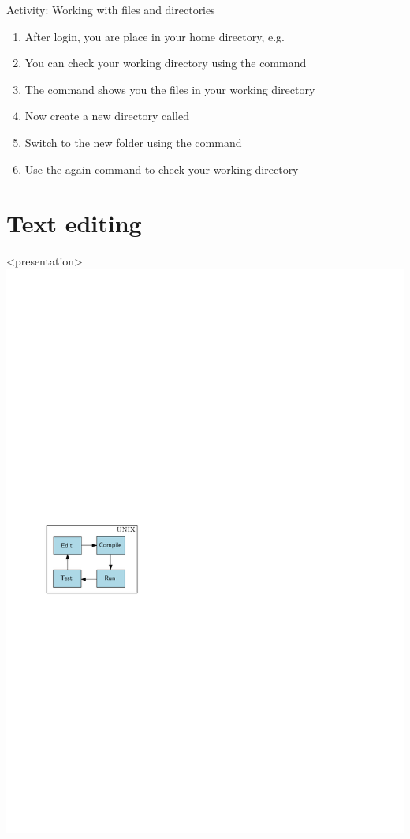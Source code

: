 \begin{frame}[fragile]{Activity: Working with files and directories}
\begin{enumerate}
\item After login, you are place in your home directory, e.g. 
\item You can check your working directory using the  command 
\item The  command shows you the files in your working directory 
\item Now create a new directory called  
\item Switch to the new folder using the  command
\item Use the  again command to check your working directory 
\end{enumerate}
\end{frame}


\section{Text editing} %

\begin{frame}<presentation>
\includegraphics[page=2,width=\textwidth]{flow}
\end{frame}

